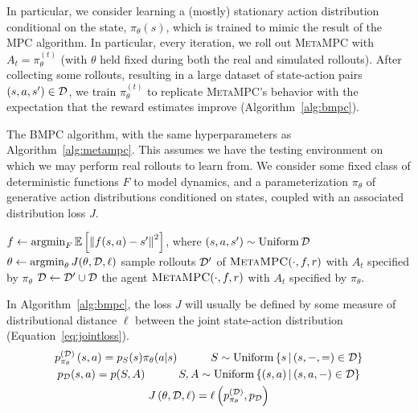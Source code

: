 \documentclass{article}
\begin{document}
In particular, we consider learning a (mostly) stationary action distribution conditional on the state, $\pi_\theta(s)$, which is trained to mimic the result of the MPC algorithm. In particular, every iteration, we roll out \textsc{MetaMPC} with $A_t=\pi_\theta^{(t)}$ (with $\theta$ held fixed during both the real and simulated rollouts). After collecting some rollouts, resulting in a large dataset of state-action pairs $(s,a, s')\in\mathcal{D}$, we train $\pi_\theta^{(t)}$ to replicate \textsc{MetaMPC}'s behavior with the expectation that the reward estimates improve (Algorithm~\ref{alg:bmpc}).

\begin{algorithm}
\caption{The \textsc{BMPC} algorithm, with the same hyperparameters as Algorithm~\ref{alg:metampc}. This assumes we have the testing environment on which we may perform real rollouts to learn from. We consider some fixed class of deterministic functions $F$ to model dynamics, and a parameterization $\pi_\theta$ of generative action distributions conditioned on states, coupled with an associated distribution loss $J$.} \label{alg:bmpc}
\begin{algorithmic}[1]
\State $f\gets \operatorname*{argmin}_F\operatorname{\mathbb{E}}\left[{\left\lVert f(s,a)-s' \right\rVert^2}\right]$, where $(s,a,s')\sim\operatorname{Uniform}\mathcal{D}$
\State $\theta \gets \operatorname*{argmin}_\theta J(\theta, \mathcal{D}, \ell)$
\State sample rollouts $\mathcal{D}'$ of $\textsc{MetaMPC}(\cdot, f, r)$ with $A_t$ specified by $\pi_\theta$
\State $\mathcal{D}\gets\mathcal{D}'\cup\mathcal{D}$
\EndFor
\State \Return the agent $\textsc{MetaMPC}(\cdot, f, r)$ with $A_t$ specified by $\pi_\theta$.
\EndProcedure
\end{algorithmic}
\end{algorithm}

In Algorithm~\ref{alg:bmpc}, the loss $J$ will usually be defined by some measure of distributional distance $\ell$ between the joint state-action distribution (Equation~\ref{eq:jointloss}).
\begin{equation}\label{eq:jointloss}
  \begin{gathered}
  p_{\pi_\theta}^{(\mathcal{D})}\left({s, a}\right)=p_{S}(s)\pi_\theta(a|s)\quad\quad\quad S\sim \operatorname{Uniform}\left\{ s \,\middle|\, (s,{-},{=})\in\mathcal{D} \right\}  \\
  p_{\mathcal{D}}(s,a)=p(S,A)\quad\quad\quad S,A\sim \operatorname{Uniform}\left\{ (s,a) \,\middle|\, (s,a,{-})\in\mathcal{D} \right\} \\
  J\left({\theta,\mathcal{D},\ell}\right)=\ell\left({p_{\pi_\theta}^{(\mathcal{D})}, p_{\mathcal{D}}}\right)
  \end{gathered}
\end{equation}
\end{document}
